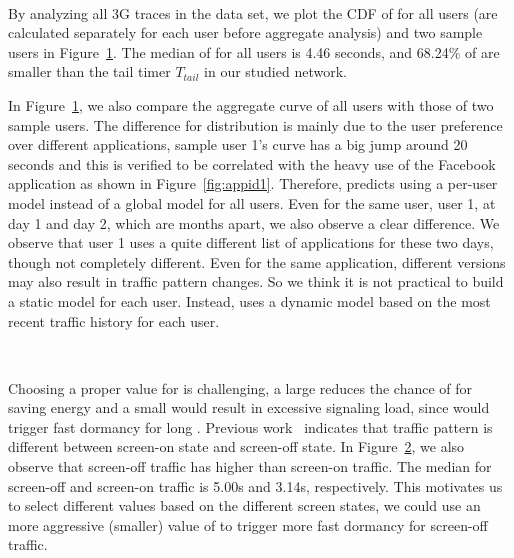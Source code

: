 \begin{figure}[t]
\centering
{} \\
\label{fig:cdf.ibt}
\end{figure}


By analyzing all 3G traces in the \UMICH data set, we plot the CDF of \IBTS for all users (\IBTS are calculated separately for each user before aggregate analysis) and two sample users in Figure~\ref{fig:cdf.ibt}. The median of \IBT for all users is 4.46 seconds, and 68.24\% of \IBTS are smaller than the tail timer $T_{tail}$ in our studied network.

In Figure~\ref{fig:cdf.ibt}, we also compare the aggregate curve of all users with those of two sample users. The difference for \IBT distribution is mainly due to the user preference over different applications, \eg sample user 1's curve has a big jump around 20 seconds and this is verified to be correlated with the heavy use of the Facebook application as shown in Figure~\ref{fig:appid1}. Therefore, \NAME predicts \IBT using a per-user model instead of a global model for all users. Even for the same user, \ie user 1, at day 1 and day 2, which are months apart, we also observe a clear difference. We observe that user 1 uses a quite different list of applications for these two days, though not completely different. Even for the same application, different versions may also result in traffic pattern changes. So we think it is not practical to build a static model for each user. Instead, \NAME uses a dynamic model based on the most recent traffic history for each user.


\begin{figure}[t]
\centering
{} \\
\label{fig:cdf.screen}
\end{figure}
Choosing a proper value for \SBT is challenging, \ie a large \SBT reduces the chance of \NAME for saving energy and a small \SBT would result in excessive signaling load, since \NAME would trigger fast dormancy for long \IBTS. Previous work~\cite{imc.screen} indicates that traffic pattern is different between screen-on state and screen-off state. In Figure~\ref{fig:cdf.screen}, we also observe that screen-off traffic has higher \IBTS than screen-on traffic. The median \IBT for screen-off and screen-on traffic is 5.00s and 3.14s, respectively. This motivates us to select different \SBT values based on the different screen states, \ie we could use an more aggressive (smaller) value of \SBT to trigger more fast dormancy for screen-off traffic.

